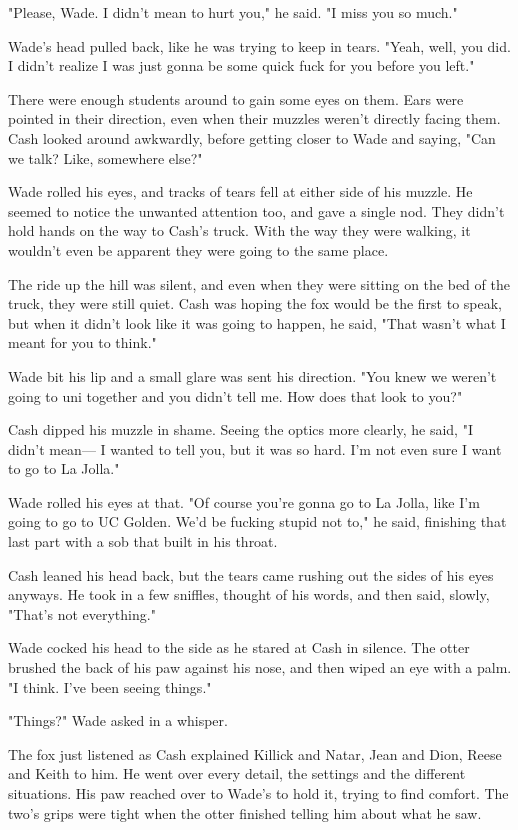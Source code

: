 "Please, Wade. I didn't mean to hurt you," he said. "I miss you so much."

Wade's head pulled back, like he was trying to keep in tears. "Yeah, well, you did. I didn't realize I was just gonna be some quick fuck for you before you left."

There were enough students around to gain some eyes on them. Ears were pointed in their direction, even when their muzzles weren't directly facing them. Cash looked around awkwardly, before getting closer to Wade and saying, "Can we talk? Like, somewhere else?"

Wade rolled his eyes, and tracks of tears fell at either side of his muzzle. He seemed to notice the unwanted attention too, and gave a single nod. They didn't hold hands on the way to Cash's truck. With the way they were walking, it wouldn't even be apparent they were going to the same place.

The ride up the hill was silent, and even when they were sitting on the bed of the truck, they were still quiet. Cash was hoping the fox would be the first to speak, but when it didn't look like it was going to happen, he said, "That wasn't what I meant for you to think."

Wade bit his lip and a small glare was sent his direction. "You knew we weren't going to uni together and you didn't tell me. How does that look to you?"

Cash dipped his muzzle in shame. Seeing the optics more clearly, he said, "I didn't mean--- I wanted to tell you, but it was so hard. I'm not even sure I want to go to La Jolla."

Wade rolled his eyes at that. "Of course you're gonna go to La Jolla, like I'm going to go to UC Golden. We'd be fucking stupid not to," he said, finishing that last part with a sob that built in his throat.

Cash leaned his head back, but the tears came rushing out the sides of his eyes anyways. He took in a few sniffles, thought of his words, and then said, slowly, "That's not everything."

Wade cocked his head to the side as he stared at Cash in silence. The otter brushed the back of his paw against his nose, and then wiped an eye with a palm. "I think. I've been seeing things."

"Things?" Wade asked in a whisper.

The fox just listened as Cash explained Killick and Natar, Jean and Dion, Reese and Keith to him. He went over every detail, the settings and the different situations. His paw reached over to Wade's to hold it, trying to find comfort. The two's grips were tight when the otter finished telling him about what he saw.

